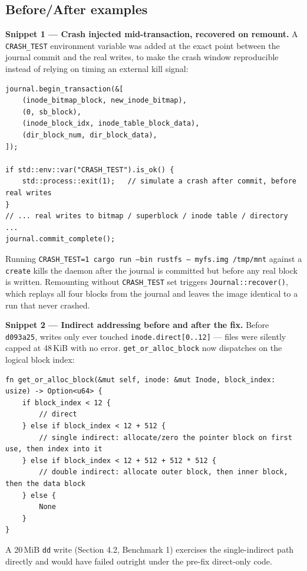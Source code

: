 \documentclass[11pt]{article}
\begin{document}
\subsection{Before/After examples}

\textbf{Snippet 1 --- Crash injected mid-transaction, recovered on remount.} A \texttt{CRASH\_TEST}
environment variable was added at the exact point between the journal commit and the real writes, to
make the crash window reproducible instead of relying on timing an external kill signal:

\begin{lstlisting}
journal.begin_transaction(&[
    (inode_bitmap_block, new_inode_bitmap),
    (0, sb_block),
    (inode_block_idx, inode_table_block_data),
    (dir_block_num, dir_block_data),
]);

if std::env::var("CRASH_TEST").is_ok() {
    std::process::exit(1);   // simulate a crash after commit, before real writes
}
// ... real writes to bitmap / superblock / inode table / directory ...
journal.commit_complete();
\end{lstlisting}
Running \texttt{CRASH\_TEST=1 cargo run --bin rustfs -- myfs.img /tmp/mnt} against a \texttt{create}
kills the daemon after the journal is committed but before any real block is written. Remounting
without \texttt{CRASH\_TEST} set triggers \texttt{Journal::recover()}, which replays all four blocks
from the journal and leaves the image identical to a run that never crashed.

\textbf{Snippet 2 --- Indirect addressing before and after the fix.} Before
\texttt{d093a25}, writes only ever touched \texttt{inode.direct[0..12]} — files were silently capped
at 48\,KiB with no error. \texttt{get\_or\_alloc\_block} now dispatches on the logical block index:
\begin{lstlisting}
fn get_or_alloc_block(&mut self, inode: &mut Inode, block_index: usize) -> Option<u64> {
    if block_index < 12 {
        // direct
    } else if block_index < 12 + 512 {
        // single indirect: allocate/zero the pointer block on first use, then index into it
    } else if block_index < 12 + 512 + 512 * 512 {
        // double indirect: allocate outer block, then inner block, then the data block
    } else {
        None
    }
}
\end{lstlisting}
A 20\,MiB \texttt{dd} write (Section 4.2, Benchmark 1) exercises the single-indirect path directly and
would have failed outright under the pre-fix direct-only code.
\end{document}
